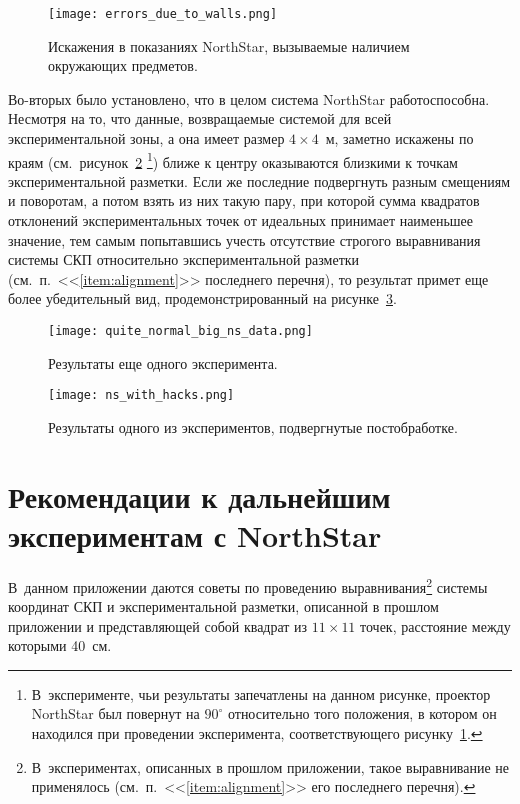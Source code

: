\begin{figure}[h!]
	\centering
	\texttt{[image: errors\_due\_to\_walls.png]}
	\caption{Искажения в показаниях NorthStar, вызываемые наличием окружающих предметов.}
	\label{img_first_result_of_exps}
\end{figure}

Во-вторых было установлено, что в целом система NorthStar работоспособна.
Несмотря на то, что данные, возвращаемые системой для всей экспериментальной зоны, а она имеет размер $4{\times}4$~м, заметно искажены по краям (см.~рисунок~\ref{img_second_result_of_exps}%
\footnote{В~эксперименте, чьи результаты запечатлены на данном рисунке, проектор NorthStar был повернут на $90^\circ$ относительно того положения, в котором он находился при проведении эксперимента, соответствующего рисунку~\ref{img_first_result_of_exps}.})
ближе к центру оказываются близкими к точкам экспериментальной разметки.
Если же последние подвергнуть разным смещениям и поворотам, а потом взять из них такую пару, при которой сумма квадратов отклонений экспериментальных точек от идеальных принимает наименьшее значение, тем самым попытавшись учесть отсутствие строгого выравнивания системы СКП относительно экспериментальной разметки (см.~п.~<<\ref{item:alignment}>> последнего перечня), то результат примет еще более убедительный вид, продемонстрированный на рисунке~\ref{img_second_result_of_exps_with_hacks}.

\begin{figure}[h!]
	\centering
	\texttt{[image: quite\_normal\_big\_ns\_data.png]}
	\caption{Результаты еще одного эксперимента.}
	\label{img_second_result_of_exps}
\end{figure}

\begin{figure}[h!]
	\centering
	\texttt{[image: ns\_with\_hacks.png]}
	\caption{Результаты одного из экспериментов, подвергнутые постобработке.}
	\label{img_second_result_of_exps_with_hacks}
\end{figure}



\chapter{Рекомендации к дальнейшим экспериментам с NorthStar}\label{app_expers_with_ns_2}
В~данном приложении даются советы по проведению выравнивания\footnote{В~экспериментах, описанных в прошлом приложении, такое выравнивание не применялось (см.~п.~<<\ref{item:alignment}>> его последнего перечня).}
системы координат СКП и экспериментальной разметки, описанной в прошлом приложении и представляющей собой квадрат из $11{\times}11$ точек, расстояние между которыми 40~см.

